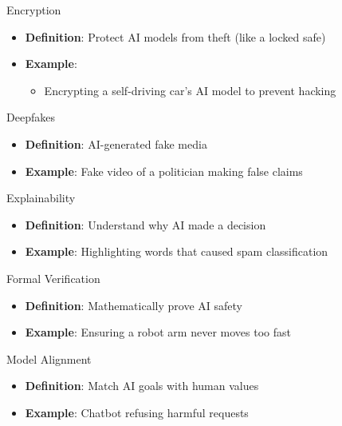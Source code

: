 \documentclass{beamer}
\begin{document}
\begin{frame}{Encryption}
\begin{itemize}
\item \textbf{Definition}: Protect AI models from theft (like a locked safe)
\item \textbf{Example}: 
  \begin{itemize}
  \item Encrypting a self-driving car’s AI model to prevent hacking
  \end{itemize}
\end{itemize}
\end{frame}


\begin{frame}{Deepfakes}
\begin{itemize}
\item \textbf{Definition}: AI-generated fake media
\item \textbf{Example}: Fake video of a politician making false claims
\end{itemize}
\end{frame}

\begin{frame}{Explainability}
\begin{itemize}
\item \textbf{Definition}: Understand why AI made a decision
\item \textbf{Example}: Highlighting words that caused spam classification
\end{itemize}
\end{frame}

\begin{frame}{Formal Verification}
\begin{itemize}
\item \textbf{Definition}: Mathematically prove AI safety
\item \textbf{Example}: Ensuring a robot arm never moves too fast
\end{itemize}
\end{frame}

\begin{frame}{Model Alignment}
\begin{itemize}
\item \textbf{Definition}: Match AI goals with human values
\item \textbf{Example}: Chatbot refusing harmful requests
\end{itemize}
\end{frame}
\end{document}

